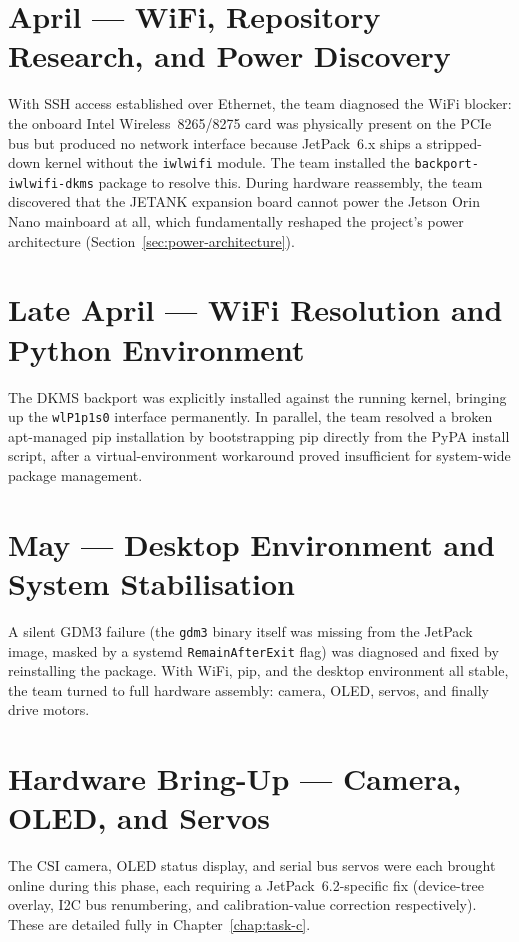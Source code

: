\documentclass{imc-inf}
\begin{document}
\section{April --- WiFi, Repository Research, and Power Discovery}
\label{sec:april}

With SSH access established over Ethernet, the team diagnosed the WiFi blocker:
the onboard Intel Wireless~8265/8275 card was physically present on the PCIe bus
but produced no network interface because JetPack~6.x ships a stripped-down kernel
without the \texttt{iwlwifi} module. The team installed the \texttt{backport-iwlwifi-dkms}
package to resolve this. During hardware reassembly, the team discovered that the
JETANK expansion board cannot power the Jetson Orin Nano mainboard at all, which
fundamentally reshaped the project's power architecture (Section~\ref{sec:power-architecture}).

\section{Late April --- WiFi Resolution and Python Environment}
\label{sec:late-april}

The DKMS backport was explicitly installed against the running kernel, bringing up
the \texttt{wlP1p1s0} interface permanently. In parallel, the team resolved a broken
apt-managed pip installation by bootstrapping pip directly from the PyPA install
script, after a virtual-environment workaround proved insufficient for system-wide
package management.

\section{May --- Desktop Environment and System Stabilisation}
\label{sec:may}

A silent GDM3 failure (the \texttt{gdm3} binary itself was missing from the JetPack
image, masked by a systemd \texttt{RemainAfterExit} flag) was diagnosed and fixed by
reinstalling the package. With WiFi, pip, and the desktop environment all stable,
the team turned to full hardware assembly: camera, OLED, servos, and finally drive
motors.

\section{Hardware Bring-Up --- Camera, OLED, and Servos}
\label{sec:hardware-bringup}

The CSI camera, OLED status display, and serial bus servos were each brought online
during this phase, each requiring a JetPack~6.2-specific fix (device-tree overlay,
I2C bus renumbering, and calibration-value correction respectively). These are
detailed fully in Chapter~\ref{chap:task-c}.
\end{document}

